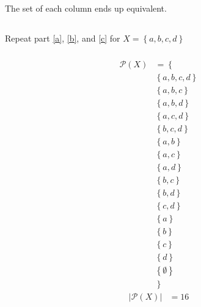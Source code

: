 \documentclass{article}
\begin{document}
The set of each column ends up equivalent.

\subsection{}

Repeat part \ref{a}, \ref{b}, and \ref{c} for $ X = \left\{ a, b, c, d \right\} $

\subsubsection{}

\begin{align*}
	\mathcal{P}(X) & = \left\{ \right.           \\
	               & \left\{ a, b, c, d \right\} \\
	               & \left\{ a, b, c \right\}    \\
	               & \left\{ a, b, d \right\}    \\
	               & \left\{ a, c, d \right\}    \\
	               & \left\{ b, c, d \right\}    \\
	               & \left\{ a, b \right\}       \\
	               & \left\{ a, c \right\}       \\
	               & \left\{ a, d \right\}       \\
	               & \left\{ b, c \right\}       \\
	               & \left\{ b, d \right\}       \\
	               & \left\{ c, d \right\}       \\
	               & \left\{ a \right\}          \\
	               & \left\{ b \right\}          \\
	               & \left\{ c \right\}          \\
	               & \left\{ d \right\}          \\
	               & \left\{ \emptyset \right\}  \\
	               & \left. \right\}
\end{align*}
\begin{align*}
	\left| \mathcal{P}(X) \right| & = 16
\end{align*}

\subsubsection{}
\end{document}
